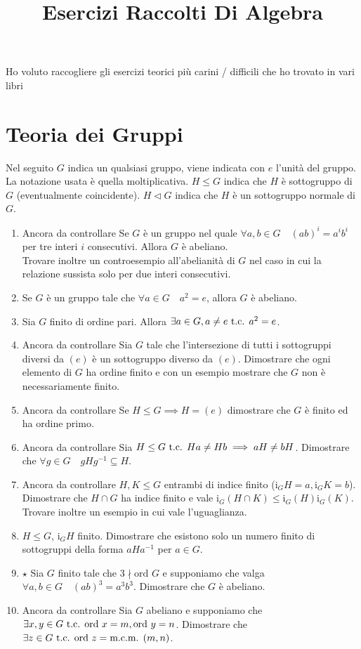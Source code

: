 \documentclass[a4paper,NoNotes,GeneralMath]{stdmdoc}
\newcommand{\Ord}{\text{ord }}
\newcommand{\sgr}{\le}
\newcommand{\nrm}{\lhd}
\newcommand{\ctrl}{{\color{blue} Ancora da controllare }}
\newcommand{\Ind}{\text{i}}
\newcommand{\mcm}{\text{m.c.m. }}
\newcommand{\Star}{ $ \star $ }
\begin{document}
	\title{Esercizi Raccolti Di Algebra}
	Ho voluto raccogliere gli esercizi teorici più carini / difficili che ho trovato in vari libri

	\section*{Teoria dei Gruppi}
	Nel seguito $G$ indica un qualsiasi gruppo, viene indicata con $e$ l'unità del gruppo. La notazione usata è quella moltiplicativa. $H \sgr G$ indica che $H$ è sottogruppo di $G$ (eventualmente coincidente). $H \nrm G$ indica che $H$ è un sottogruppo normale di $G$.
	\begin{enumerate}
		\item \ctrl Se $G$ è un gruppo nel quale $\forall a,b \in G \quad (ab)^i = a^i b^i$ per tre interi $i$ consecutivi. Allora $G$ è abeliano. \\ Trovare inoltre un controesempio all'abelianità di $G$ nel caso in cui la relazione sussista solo per due interi consecutivi.
		\item Se $G$ è un gruppo tale che $\forall a \in G \quad a^2 = e$, allora $G$ è abeliano.
		\item Sia $G$ finito di ordine pari. Allora $\exists a \in G, a \neq e \mbox{ t.c. } a^2 = e$.
		\item \ctrl Sia $G$ tale che l'intersezione di tutti i sottogruppi diversi da $(e)$ è un sottogruppo diverso da $(e)$. Dimostrare che ogni elemento di $G$ ha ordine finito e con un esempio mostrare che $G$ non è necessariamente finito.
		\item \ctrl Se $H \sgr G \implies H = (e)$ dimostrare che $G$ è finito ed ha ordine primo.
		\item \ctrl Sia $H \sgr G \tc Ha \neq Hb \implies aH \neq bH$. Dimostrare che $\forall g\in G \quad gHg^{-1} \subseteq H$.
		\item \ctrl $H, K \sgr G$ entrambi di indice finito ($\Ind_G H = a, \Ind_G K = b$). Dimostrare che $H\cap G$ ha indice finito e vale $\Ind_G (H\cap K) \le \Ind_G(H) \Ind_G(K)$. Trovare inoltre un esempio in cui vale l'uguaglianza.
		\item $H \sgr G$, $\Ind_G H$ finito. Dimostrare che esistono solo un numero finito di sottogruppi della forma $aHa^{-1}$ per $a \in G$.
		\item \Star Sia $G$ finito tale che $3 \nmid \Ord G$ e supponiamo che valga $\forall a,b \in G \quad (ab)^3 = a^3 b^3$. Dimostrare che $G$ è abeliano.
		\item \ctrl Sia $G$ abeliano e supponiamo che $\exists x,y \in G \tc \Ord x = m, \Ord y = n$. Dimostrare che $\exists z \in G \tc \Ord z = \mcm(m,n)$.

\end{enumerate}
\end{document}
